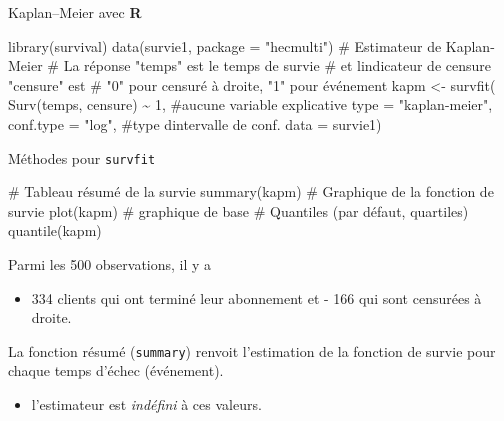 \documentclass[
  ignorenonframetext,
]{beamer}
\newenvironment{Shaded}{\begin{snugshade}}{\end{snugshade}}
\newcommand{\AttributeTok}[1]{\textcolor[rgb]{0.40,0.45,0.13}{#1}}
\newcommand{\CommentTok}[1]{\textcolor[rgb]{0.37,0.37,0.37}{#1}}
\newcommand{\DecValTok}[1]{\textcolor[rgb]{0.68,0.00,0.00}{#1}}
\newcommand{\FunctionTok}[1]{\textcolor[rgb]{0.28,0.35,0.67}{#1}}
\newcommand{\NormalTok}[1]{\textcolor[rgb]{0.00,0.23,0.31}{#1}}
\newcommand{\OtherTok}[1]{\textcolor[rgb]{0.00,0.23,0.31}{#1}}
\newcommand{\SpecialCharTok}[1]{\textcolor[rgb]{0.37,0.37,0.37}{#1}}
\newcommand{\StringTok}[1]{\textcolor[rgb]{0.13,0.47,0.30}{#1}}
\providecommand{\tightlist}{%
  \setlength{\itemsep}{0pt}\setlength{\parskip}{0pt}}\usepackage{longtable,booktabs,array}
\begin{document}
\begin{frame}[fragile]{Kaplan--Meier avec \textbf{R}}
\protect\hypertarget{kaplanmeier-avec-r}{}
\begin{Shaded}
\begin{Highlighting}[numbers=left,,]
\FunctionTok{library}\NormalTok{(survival)}
\FunctionTok{data}\NormalTok{(survie1, }\AttributeTok{package =} \StringTok{"hecmulti"}\NormalTok{)}
\CommentTok{\# Estimateur de Kaplan{-}Meier}
\CommentTok{\# La réponse "temps" est le temps de survie }
\CommentTok{\# et l\textquotesingle{}indicateur de censure "censure" est}
\CommentTok{\# "0" pour censuré à droite, "1" pour événement}
\NormalTok{kapm }\OtherTok{\textless{}{-}} \FunctionTok{survfit}\NormalTok{(}
  \FunctionTok{Surv}\NormalTok{(temps, censure) }\SpecialCharTok{\textasciitilde{}} \DecValTok{1}\NormalTok{, }
  \CommentTok{\#aucune variable explicative}
  \AttributeTok{type =} \StringTok{"kaplan{-}meier"}\NormalTok{, }
  \AttributeTok{conf.type =} \StringTok{"log"}\NormalTok{, }\CommentTok{\#type d\textquotesingle{}intervalle de conf.}
  \AttributeTok{data =}\NormalTok{ survie1)}
\end{Highlighting}
\end{Shaded}
\end{frame}

\begin{frame}[fragile]{Méthodes pour \texttt{survfit}}
\protect\hypertarget{muxe9thodes-pour-survfit}{}
\begin{Shaded}
\begin{Highlighting}[numbers=left,,]
\CommentTok{\# Tableau résumé de la survie}
\FunctionTok{summary}\NormalTok{(kapm)  }
\CommentTok{\# Graphique de la fonction de survie}
\FunctionTok{plot}\NormalTok{(kapm) }\CommentTok{\# graphique de base}
\CommentTok{\# Quantiles (par défaut, quartiles)}
\FunctionTok{quantile}\NormalTok{(kapm)}
\end{Highlighting}
\end{Shaded}

Parmi les 500 observations, il y a

\begin{itemize}
\tightlist
\item
  334 clients qui ont terminé leur abonnement et - 166 qui sont
  censurées à droite.
\end{itemize}

La fonction résumé (\texttt{summary}) renvoit l'estimation de la
fonction de survie pour chaque temps d'échec (événement).

\begin{itemize}
\tightlist
\item
  l'estimateur est \emph{indéfini} à ces valeurs.
\end{itemize}
\end{frame}
\end{document}

